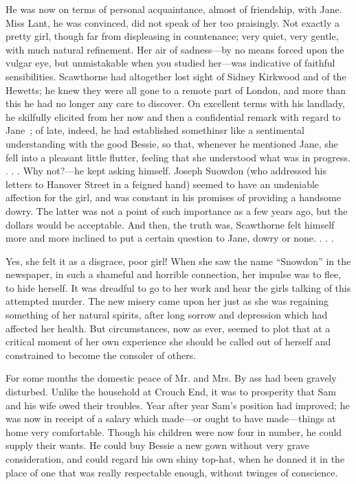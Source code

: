 He was now on terms of personal acquaintance, almost of friendship, with
Jane. Miss Lant, he was convinced, did not speak of her too praisingly.
Not exactly a pretty girl, though far from displeasing in countenance;
very quiet, very gentle, with much natural refinement. Her air of
sadness---by no means forced upon the vulgar eye, but unmistakable when
you studied her---was indicative of faithful sensibilities. Scawthorne
had altogether lost sight of Sidney Kirkwood and of the Hewetts; he knew
they were all gone to a remote part of London, and more than this he had
no longer any care to discover. On excellent terms with his landlady, he
skilfully elicited from her now and then a confidential remark with
regard to Jane~; of late, indeed, he had established somethinsr like a
sentimental understanding with the good Bessie, so that, whenever he
mentioned Jane, she fell into a pleasant little flutter, feeling that {}
she understood what was in progress. . . . Why not?---he kept asking
himself. Joseph Suowdon (who addressed his letters to Hanover Street in
a feigned hand) seemed to have an undeniable affection for the girl, and
was constant in his promises of providing a handsome dowry. The latter
was not a point of such importance as a few years ago, but the dollars
would be acceptable. And then, the truth was, Scawthorne felt himself
more and more inclined to put a certain question to Jane, dowry or none.
. . .

Yes, she felt it as a disgrace, poor girl! When she saw the name
``Snowdon'' in the newspaper, in such a shameful and horrible
connection, her impulse was to flee, to hide herself. It was dreadful to
go to her work and hear the girls talking of this attempted murder. The
new misery came upon her just as she was regaining something of her
natural spirits, after long sorrow and depression which had affected her
health. But circumstances, now as ever, seemed to plot that at a
critical moment of her own experience she should be called out of
herself and constrained to become the consoler of others.

{} For some months the domestic peace of Mr. and Mrs. By ass had been
gravely disturbed. Unlike the household at Crouch End, it was to
prosperity that Sam and his wife owed their troubles. Year after year
Sam's position had improved; he was now in receipt of a salary which
made---or ought to have made---things at home very comfortable. Though
his children were now four in number, he could supply their wants. He
could buy Bessie a new gown without very grave consideration, and could
regard his own shiny top-hat, when he donned it in the place of one that
was really respectable enough, without twinges of conscience.

